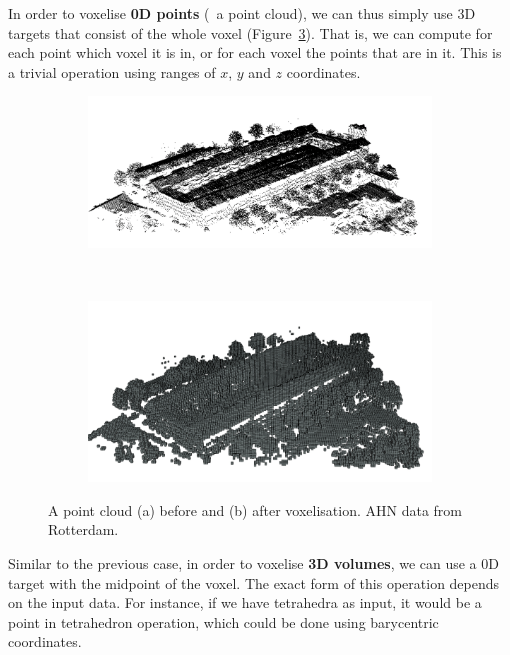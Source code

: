 In order to voxelise \textbf{0D points} (\eg\ a point cloud), we can thus simply use 3D targets that consist of the whole voxel (Figure~\ref{fig:points}).
That is, we can compute for each point which voxel it is in, or for each voxel the points that are in it.
This is a trivial operation using ranges of \(x\), \(y\) and \(z\) coordinates.

\begin{figure}
\centering
\begin{subfigure}[b]{\linewidth}
\includegraphics[width=\linewidth]{figs/points-pre}
\caption{}%
\label{subfig:points-pre}
\end{subfigure}
\\
\begin{subfigure}[b]{\linewidth}
\includegraphics[width=\linewidth]{figs/points-post}
\caption{}%
\label{subfig:points-post}
\end{subfigure}
\caption{A point cloud (a) before and (b) after voxelisation. AHN data from Rotterdam.}%
\label{fig:points}
\end{figure}

Similar to the previous case, in order to voxelise \textbf{3D volumes}, we can use a 0D target with the midpoint of the voxel.
The exact form of this operation depends on the input data.
For instance, if we have tetrahedra as input, it would be a point in tetrahedron operation, which could be done using barycentric coordinates.

